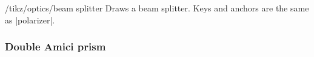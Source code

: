 \documentclass[a4paper]{ltxdoc}
\begin{document}
\begin{stylekey}{/tikz/optics/beam splitter}
Draws a beam splitter. Keys and anchors are the same as |polarizer|.

\begin{codeexample}[width=6cm]
\end{codeexample}

\end{stylekey}


\subsubsection{Double Amici prism}
\end{document}
